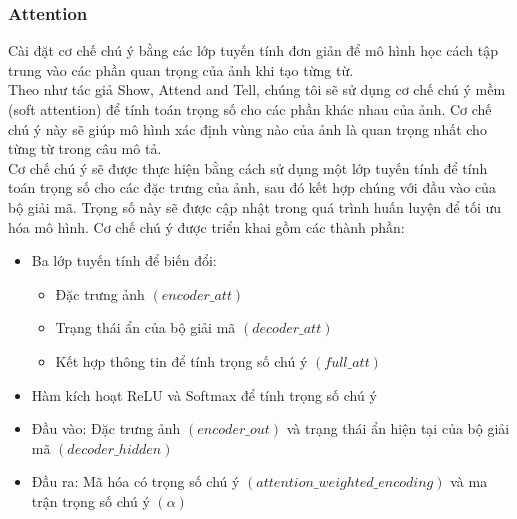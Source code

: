 \documentclass[conference]{IEEEtran}
\begin{document}
\subsubsection{Attention}
Cài đặt cơ chế chú ý bằng các lớp tuyến tính đơn giản để mô hình học cách tập trung vào các phần quan trọng của ảnh khi tạo từng từ.\\
Theo như tác giả Show, Attend and Tell, chúng tôi sẽ sử dụng cơ chế chú ý mềm (soft attention) để tính toán trọng số cho các phần khác nhau của ảnh. Cơ chế chú ý này sẽ giúp mô hình xác định vùng nào của ảnh là quan trọng nhất cho từng từ trong câu mô tả.\\
Cơ chế chú ý sẽ được thực hiện bằng cách sử dụng một lớp tuyến tính để tính toán trọng số cho các đặc trưng của ảnh, sau đó kết hợp chúng với đầu vào của bộ giải mã. Trọng số này sẽ được cập nhật trong quá trình huấn luyện để tối ưu hóa mô hình.
Cơ chế chú ý được triển khai gồm các thành phần:
\begin{itemize}
    \item Ba lớp tuyến tính để biến đổi:
    \begin{itemize}
        \item Đặc trưng ảnh $(encoder\_att)$
        \item Trạng thái ẩn của bộ giải mã $(decoder\_att)$
        \item Kết hợp thông tin để tính trọng số chú ý $(full\_att)$
    \end{itemize}
    \item Hàm kích hoạt ReLU và Softmax để tính trọng số chú ý
    \item Đầu vào: Đặc trưng ảnh $(encoder\_out)$ và trạng thái ẩn hiện tại của bộ giải mã $(decoder\_hidden)$
    \item Đầu ra: Mã hóa có trọng số chú ý $(attention\_weighted\_encoding)$ và ma trận trọng số chú ý $(\alpha)$
\end{itemize}
\end{document}
